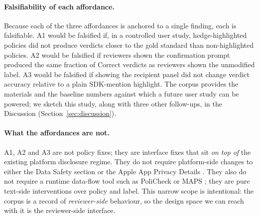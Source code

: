 \documentclass[11pt,a4paper]{article}
\begin{document}
\paragraph{Falsifiability of each affordance.}
Because each of the three affordances is anchored to a single
finding, each is falsifiable. A1 would be falsified if, in a
controlled user study, hedge-highlighted policies did not produce
verdicts closer to the gold standard than non-highlighted policies.
A2 would be falsified if reviewers shown the confirmation prompt
produced the same fraction of Correct verdicts as reviewers shown
the unmodified label. A3 would be falsified if showing the recipient
panel did not change verdict accuracy relative to a plain
SDK-mention highlight. The corpus provides the materials and the
baseline numbers against which a future user study can be powered;
we sketch this study, along with three other follow-ups, in the
Discussion (Section~\ref{sec:discussion}).

\paragraph{What the affordances are not.}
A1, A2 and A3 are not policy fixes; they are interface fixes that
sit \emph{on top of} the existing platform disclosure regime. They do
not require platform-side changes to either the Data Safety section
or the Apple App Privacy Details
\citep{googledatasafety2022,appleprivacylabels2020}. They also do not
require a runtime data-flow tool such as PoliCheck
\citep{andow2020policheck} or MAPS \citep{zimmeck2019maps}; they are
pure text-side interventions over policy and label. This narrow
scope is intentional: the corpus is a record of \emph{reviewer-side}
behaviour, so the design space we can reach with it is the
reviewer-side interface.
\end{document}
